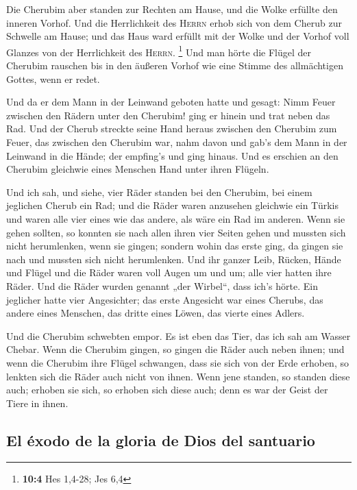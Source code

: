  Die Cherubim aber standen zur Rechten am Hause, und die
Wolke erfüllte den inneren Vorhof.  Und die Herrlichkeit
des \textsc{Herrn} erhob sich von dem Cherub zur Schwelle am Hause; und
das Haus ward erfüllt mit der Wolke und der Vorhof voll Glanzes von der
Herrlichkeit des \textsc{Herrn}. \footnote{\textbf{10:4} Hes 1,4-28; Jes
  6,4}  Und man hörte die Flügel der Cherubim rauschen bis
in den äußeren Vorhof wie eine Stimme des allmächtigen Gottes, wenn er
redet.

 Und da er dem Mann in der Leinwand geboten hatte und
gesagt: Nimm Feuer zwischen den Rädern unter den Cherubim! ging er
hinein und trat neben das Rad.  Und der Cherub streckte
seine Hand heraus zwischen den Cherubim zum Feuer, das zwischen den
Cherubim war, nahm davon und gab's dem Mann in der Leinwand in die
Hände; der empfing's und ging hinaus.  Und es erschien an
den Cherubim gleichwie eines Menschen Hand unter ihren Flügeln.

 Und ich sah, und siehe, vier Räder standen bei den
Cherubim, bei einem jeglichen Cherub ein Rad; und die Räder waren
anzusehen gleichwie ein Türkis  und waren alle vier eines
wie das andere, als wäre ein Rad im anderen.  Wenn sie
gehen sollten, so konnten sie nach allen ihren vier Seiten gehen und
mussten sich nicht herumlenken, wenn sie gingen; sondern wohin das erste
ging, da gingen sie nach und mussten sich nicht herumlenken.
 Und ihr ganzer Leib, Rücken, Hände und Flügel und die
Räder waren voll Augen um und um; alle vier hatten ihre Räder.
 Und die Räder wurden genannt „der Wirbel``, dass ich's
hörte.  Ein jeglicher hatte vier Angesichter; das erste
Angesicht war eines Cherubs, das andere eines Menschen, das dritte eines
Löwen, das vierte eines Adlers.

 Und die Cherubim schwebten empor. Es ist eben das Tier,
das ich sah am Wasser Chebar.  Wenn die Cherubim gingen,
so gingen die Räder auch neben ihnen; und wenn die Cherubim ihre Flügel
schwangen, dass sie sich von der Erde erhoben, so lenkten sich die Räder
auch nicht von ihnen.  Wenn jene standen, so standen
diese auch; erhoben sie sich, so erhoben sich diese auch; denn es war
der Geist der Tiere in ihnen.

\hypertarget{el-uxe9xodo-de-la-gloria-de-dios-del-santuario}{%
\subsection{El éxodo de la gloria de Dios del
santuario}\label{el-uxe9xodo-de-la-gloria-de-dios-del-santuario}}

